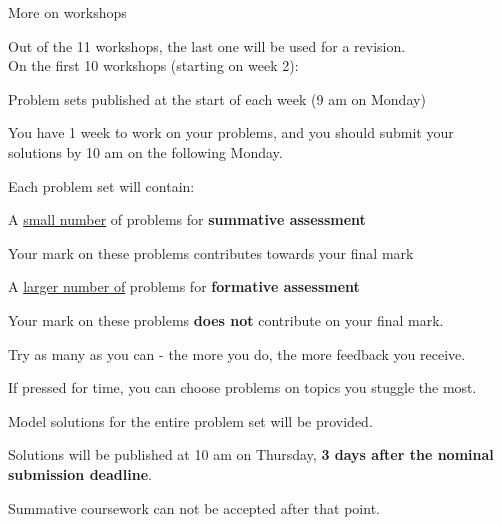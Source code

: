 %
%
%

\begin{frame}{More on workshops}

Out of the 11 workshops, the last one will be used for a revision.\\
\vspace{0.2cm}
On the first 10 workshops (starting on week 2):\\
\begin{itemize}
{\small
  \item Problem sets published at the start of each week (9 am on Monday)
  \item You have 1 week to work on your problems,
    and you should submit your solutions by 10 am on the following Monday.
}
\end{itemize}

Each problem set will contain:\\
\begin{itemize}
{\small
  \item A \underline{small number} of problems for {\bf summative assessment}
  \begin{itemize}
  {\scriptsize
    \item Your mark on these problems contributes towards your final mark
  }
  \end{itemize}

  \item A \underline{larger number of} problems for {\bf formative assessment}
  \begin{itemize}
  {\scriptsize
    \item Your mark on these problems {\bf does not} contribute on your final mark.
    \item Try as many as you can - the more you do, the more feedback you receive.
    \item If pressed for time, you can choose problems on topics you stuggle the most.\\
  }
  \end{itemize}
}
\end{itemize}

Model solutions for the entire problem set will be provided.
\begin{itemize}
{\small
  \item Solutions will be published at 10 am on Thursday,
      {\bf 3 days after the nominal submission deadline}.\\
  \item Summative coursework can not be accepted
      after that point.\\
}
\end{itemize}




\end{frame}

